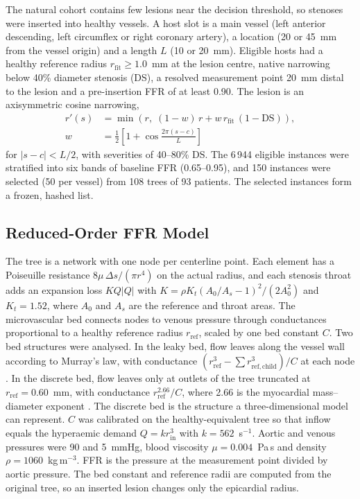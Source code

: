 \documentclass[journal]{IEEEtran}
\begin{document}
The natural cohort contains few lesions near the decision threshold, so stenoses were inserted into healthy vessels.
A host slot is a main vessel (left anterior descending, left circumflex or right coronary artery), a location
(20 or 45~mm from the vessel origin) and a length $L$ (10 or 20~mm). Eligible hosts had a healthy reference radius
$r_\mathrm{fit} \geq 1.0$~mm at the lesion centre, native narrowing below 40\% diameter stenosis (DS), a resolved
measurement point 20~mm distal to the lesion and a pre-insertion FFR of at least 0.90. The lesion is an axisymmetric
cosine narrowing,
\begin{equation}
\begin{aligned}
r'(s) &= \min\!\left(r,\; (1-w)\,r + w\,r_\mathrm{fit}\,(1-\mathrm{DS})\right),\\
w &= \tfrac{1}{2}\left[1+\cos\tfrac{2\pi (s-c)}{L}\right]
\end{aligned}
\end{equation}
for $|s-c|<L/2$, with severities of 40--80\% DS. The 6\,944 eligible instances were stratified into six bands of
baseline FFR (0.65--0.95), and 150 instances were selected (50 per vessel) from 108 trees of 93 patients. The
selected instances form a frozen, hashed list.

\subsection{Reduced-Order FFR Model}
The tree is a network with one node per centerline point. Each element has a Poiseuille resistance
$8\mu\,\Delta s/(\pi r^4)$ on the actual radius, and each stenosis throat adds an expansion loss
$K Q|Q|$ with $K = \rho K_t (A_0/A_s - 1)^2 / (2A_0^2)$ and $K_t = 1.52$, where $A_0$ and $A_s$ are the reference and
throat areas. The microvascular bed connects nodes to venous pressure through conductances proportional to a healthy
reference radius $r_\mathrm{ref}$, scaled by one bed constant $C$. Two bed structures were analysed. In the leaky
bed, flow leaves along the vessel wall according to Murray's law, with conductance $(r_\mathrm{ref}^3 - \sum
r_{\mathrm{ref},\mathrm{child}}^3)/C$ at each node \cite{murray1926}. In the discrete bed, flow leaves only at outlets
of the tree truncated at $r_\mathrm{ref} = 0.60$~mm, with conductance $r_\mathrm{ref}^{2.66}/C$, where 2.66 is the
myocardial mass--diameter exponent \cite{choy2008}. The discrete bed is the structure a three-dimensional model can
represent. $C$ was calibrated on the healthy-equivalent tree so that inflow equals the hyperaemic demand $Q = k
r_\mathrm{in}^3$ with $k = 562$~s$^{-1}$. Aortic and venous pressures were 90 and 5~mmHg, blood viscosity
$\mu = 0.004$~Pa\,s and density $\rho = 1060$~kg\,m$^{-3}$. FFR is the pressure at the measurement point divided by
aortic pressure. The bed constant and reference radii are computed from the original tree, so an inserted lesion
changes only the epicardial radius.
\end{document}
